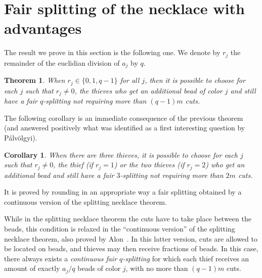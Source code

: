 \documentclass[12pt]{amsart}
\newtheorem{theorem}{Theorem}
\newtheorem{corollary}{Corollary}
\theoremstyle{remark}
\begin{document}
\section{Fair splitting of the necklace with advantages}

The result we prove in this section is the following one. We denote by $r_j$ the remainder of the euclidian division of $a_j$ by $q$.

\begin{theorem}\label{thm:neck}
When $r_j\in\{0,1,q-1\}$ for all $j$, then it is possible to choose for each $j$ such that $r_j\neq 0$, the thieves who get an additional bead of color $j$ and still have a fair $q$-splitting not requiring more than $(q-1)m$ cuts.
\end{theorem}

The following corollary is an immediate consequence of the previous theorem (and answered positively what was identified as a first interesting question by P{\'a}lv{\"o}lgyi).
\begin{corollary}
When there are three thieves, it is possible to choose for each $j$ such that $r_j\neq 0$, the thief (if $r_j=1$) or the two thieves (if $r_j=2$) who get an additional bead and still have a fair $3$-splitting not requiring more than $2m$ cuts.
\end{corollary}

It is proved by rounding in an appropriate way a fair splitting obtained by a continuous version of the splitting necklace theorem.

While in the splitting necklace theorem the cuts have to take place between the beads, this condition is relaxed in the ``continuous version'' of the splitting necklace theorem, also proved by Alon~\cite{alon1987splitting}. In this latter version, cuts are allowed to be located on beads, and  thieves may then receive fractions of beads. In this case, there always exists a {\em continuous fair $q$-splitting} for which each thief receives an amount of exactly $a_j/q$ beads of color $j$, with no more than $(q-1)m$ cuts.
\end{document}
